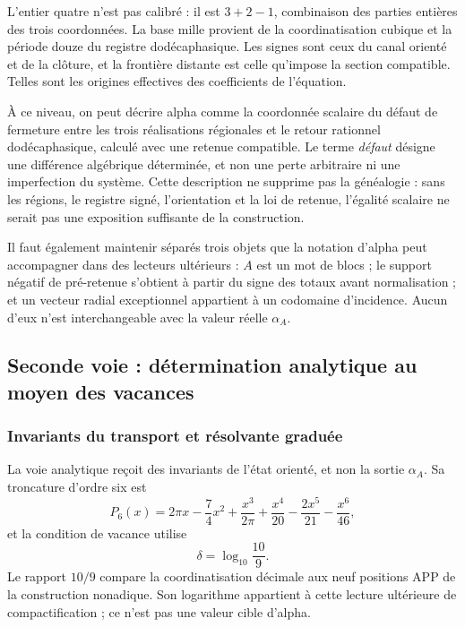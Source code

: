 L'entier quatre n'est pas calibré : il est
\(3+2-1\), combinaison des parties entières des trois coordonnées.
La base mille provient de la coordinatisation cubique et la période douze du registre dodécaphasique. Les
signes sont ceux du canal orienté et de la clôture, et la frontière distante est
celle qu'impose la section compatible. Telles sont les origines effectives des
coefficients de l'équation.

À ce niveau, on peut décrire alpha comme la coordonnée scalaire du défaut de fermeture entre les trois réalisations régionales et le retour rationnel dodécaphasique, calculé avec une retenue compatible. Le terme \emph{défaut} désigne une différence algébrique déterminée, et non une perte arbitraire ni une imperfection du système. Cette description ne supprime pas la généalogie : sans les régions, le registre signé, l'orientation et la loi de retenue, l'égalité scalaire ne serait pas une exposition suffisante de la construction.

Il faut également maintenir séparés trois objets que la notation d'alpha peut accompagner dans des lecteurs ultérieurs : \(A\) est un mot de blocs ; le support négatif de pré-retenue s'obtient à partir du signe des totaux avant normalisation ; et un vecteur radial exceptionnel appartient à un codomaine d'incidence. Aucun d'eux n'est interchangeable avec la valeur réelle \(\alpha_A\).






\subsection{Seconde voie : détermination analytique au moyen des vacances}
\subsubsection{Invariants du transport et résolvante graduée}
\label{subsec:alpha-via-b}

La voie analytique reçoit des invariants de l'état orienté, et non la sortie
\(\alpha_A\). Sa troncature d'ordre six est
\begin{equation}
 P_6(x)=2\pi x-\frac74x^2
 +\frac{x^3}{2\pi}
 +\frac{x^4}{20}-\frac{2x^5}{21}-\frac{x^6}{46},
 \label{eq:alpha-p6}
\end{equation}
et la condition de vacance utilise
\[
 \delta=\log_{10}\frac{10}{9}.
\]
Le rapport \(10/9\) compare la coordinatisation décimale aux neuf positions
APP de la construction nonadique. Son logarithme appartient à cette lecture
ultérieure de compactification ; ce n'est pas une valeur cible d'alpha.


